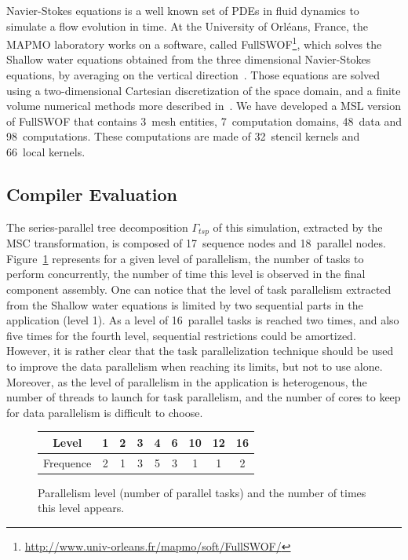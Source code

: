 Navier-Stokes equations is a well known set of PDEs in fluid dynamics to simulate a flow evolution in time. At the University of Orl\'eans, France, the MAPMO laboratory works on a software, called FullSWOF\footnote{\url{http://www.univ-orleans.fr/mapmo/soft/FullSWOF/}}, which solves the Shallow water equations obtained from the three dimensional Navier-Stokes equations, by averaging on the vertical direction~\cite{Ferrari2004}. Those equations are solved using a two-dimensional Cartesian discretization of the space domain, and a finite volume numerical methods more described in~\cite{CPE:CPE3494}. We have developed a MSL version of FullSWOF that contains 3~mesh entities, 7~computation domains, 48~data and 98~computations. These computations are made of 32~stencil kernels and 66~local kernels.

\subsection{Compiler Evaluation}

The series-parallel tree decomposition $\Gamma_{tsp}$ of this simulation, extracted by the MSC transformation, is composed of 17~sequence nodes and 18~parallel nodes. Figure~\ref{fig:freq} represents for a given level of parallelism, \ie the number of tasks to perform concurrently, the number of time this level is observed in the final component assembly. One can notice that the level of task parallelism extracted from the Shallow water equations is limited by two sequential parts in the application (level 1). As a level of 16~parallel tasks is reached two times, and also five times for the fourth level, sequential restrictions could be amortized. However, it is rather clear that the task parallelization technique should be used to improve the data parallelism when reaching its limits, but not to use alone. Moreover, as the level of parallelism in the application is heterogenous, the number of threads to launch for task parallelism, and the number of cores to keep for data parallelism is difficult to choose.

\begin{figure}[!h]
 \begin{center}
 \begin{tabular}{|c|c|c|c|c|c|c|c|c|}
    \hline 
   Level & 1 & 2 & 3 & 4 & 6 & 10 & 12 & 16\\
   \hline
   Frequence & 2 & 1 & 3 & 5 & 3 & 1 & 1 & 2\\
   \hline
 \end{tabular}
\caption{Parallelism level (number of parallel tasks) and the number of times this level appears.}
\label{fig:freq}
 \end{center}
\end{figure}

